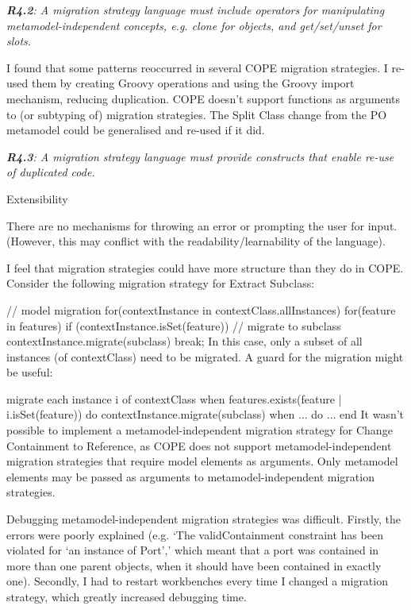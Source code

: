 \documentclass[a4paper]{article}
\begin{document}
\emph{\textbf{R4.2}: A migration strategy language must include operators for manipulating metamodel-independent concepts, e.g. clone for objects, and get/set/unset for slots.}


I found that some patterns reoccurred in several COPE migration strategies. I re-used them by creating Groovy operations and using the Groovy import mechanism, reducing duplication. COPE doesn’t support functions as arguments to (or subtyping of) migration strategies. The Split Class change from the PO metamodel could be generalised and re-used if it did.

\emph{\textbf{R4.3}: A migration strategy language must provide constructs that enable re-use of duplicated code.}




Extensibility

 There are no mechanisms for throwing an error or prompting the user for input.  (However, this may conflict with the readability/learnability of the language).

I feel that migration strategies could have more structure than they do in COPE. Consider the following migration strategy for Extract Subclass:

// model migration
  for(contextInstance in contextClass.allInstances) {
    for(feature in features) {
      if (contextInstance.isSet(feature)) {
        // migrate to subclass
        contextInstance.migrate(subclass)
        break;
      }
    }
  }
In this case, only a subset of all instances (of contextClass) need to be migrated. A guard for the migration might be useful:


  migrate each instance i of contextClass
    when
      features.exists(feature | i.isSet(feature))
    do
      contextInstance.migrate(subclass)
    when
      ...
    do
      ...
   end
It wasn’t possible to implement a metamodel-independent migration strategy for Change Containment to Reference, as COPE does not support metamodel-independent migration strategies that require model elements as arguments. Only metamodel elements may be passed as arguments to metamodel-independent migration strategies.

Debugging metamodel-independent migration strategies was difficult. Firstly, the errors were poorly explained (e.g. ‘The validContainment constraint has been violated for ‘an instance of Port’,’ which meant that a port was contained in more than one parent objects, when it should have been contained in exactly one). Secondly, I had to restart workbenches every time I changed a migration strategy, which greatly increased debugging time.
\end{document}
